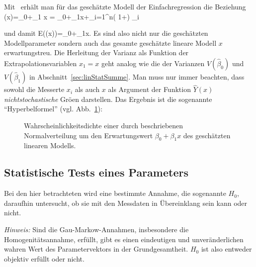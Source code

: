 Mit~
erh\"alt man f\"ur das gesch\"atzte Modell
der Einfachregression die Beziehung
\bdm
{}(x)=\hat{\beta}_0+\hat{\beta}_1 x
 = \beta_0+\beta_1x+\sum\limits_{i=1}^n\left(
1+\right) \epsilon_i
\edm

und damit
\be
E\left((x)\right)=\beta_0+\beta_1x.
\ee
Es sind also nicht nur die gesch\"atzten Modellparameter sondern auch
das gesamte gesch\"atzte lineare Modell  
$x$ erwartungstreu.
Die Herleitung der Varianz als Funktion der Extrapolationsvariablen
$x_1=x$ geht
analog wie die der Varianzen $V(\hat{\beta}_0)$ und $V(\hat{\beta}_1)$
in Abschnitt~\ref{sec:linStatSumme}. Man muss
nur immer beachten, dass sowohl die Messerte $x_i$ als auch $x$ als
Argument der Funktion $\hat{Y}(x)$ \textit{nichtstochastische}
Gr\"o\3en darstellen. Das Ergebnis ist die sogenannte 
``Hyperbelformel'' (vgl. Abb.~\ref{fig:hyperbel}):


\begin{figure}[t!]
\label{fig:hyperbel}
\vspace*{-4em}

\caption{Wahrscheinlichkeitsdichte einer durch
 \protect{} beschriebenen Normalverteilung um den 
 Erwartungswert $\beta_0+\beta_1x$ des gesch\"atzten linearen Modells.
}
\end{figure}


\subsection{\label{sec:test-single}Statistische Tests eines Parameters}

Bei den hier betrachteten  wird eine
bestimmte Annahme, die sogenannte  $H_0$, daraufhin
untersucht, ob sie mit den Messdaten in \"Ubereinklang sein kann oder
nicht. 


\emph{Hinweis:} Sind die Gau\3-Markow-Annahmen, insbesondere die
Homogenit\"atsannahme, erf\"ullt, gibt es einen eindeutigen und
unver\"anderlichen wahren Wert des Parametervektors in der Grundgesamtheit. $H_0$ ist also
entweder objektiv erf\"ullt oder nicht.

